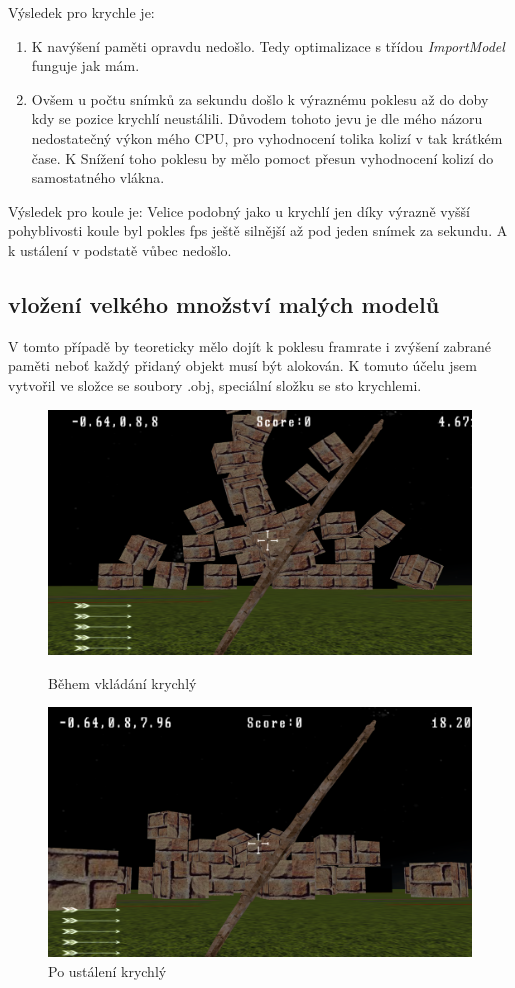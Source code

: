 Výsledek pro krychle je: 
\begin{enumerate}
	\item K navýšení paměti opravdu nedošlo. Tedy optimalizace s třídou \emph{ImportModel} funguje jak mám.
	\item Ovšem u počtu snímků za sekundu došlo k výraznému poklesu až do doby kdy se pozice krychlí neustálili. Důvodem tohoto jevu je dle mého názoru nedostatečný výkon mého CPU, pro vyhodnocení tolika kolizí v tak krátkém čase. K Snížení toho poklesu by mělo pomoct přesun vyhodnocení kolizí do samostatného vlákna.
\end{enumerate}
Výsledek pro koule je: 
Velice podobný jako u krychlí jen díky výrazně vyšší pohyblivosti koule byl pokles fps ještě silnější až pod jeden snímek za sekundu. A k ustálení v podstatě vůbec nedošlo.
\subsection{vložení velkého množství malých modelů}
V tomto případě by teoreticky mělo dojít k poklesu framrate i zvýšení zabrané paměti neboť každý přidaný objekt musí být alokován. K tomuto účelu jsem vytvořil ve složce se soubory .obj, speciální složku se sto krychlemi.
\begin{figure}[!tbp]
	\centering
	\begin{minipage}[b]{0.4\textwidth}
		\includegraphics[width=\textwidth]{obrazky-figures/17}
		\caption{Během vkládání krychlý}
	\end{minipage}
	\hfill
	\begin{minipage}[b]{0.4\textwidth}
		\includegraphics[width=\textwidth]{obrazky-figures/18}
		\caption{Po ustálení krychlý}
	\end{minipage}
\end{figure}

